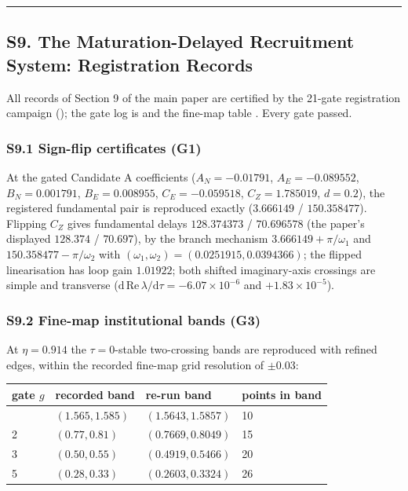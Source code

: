 \documentclass[
  10pt,
  a4paper,
]{article}
\begin{document}
\begin{center}\rule{0.5\linewidth}{0.5pt}\end{center}

\subsection{S9. The Maturation-Delayed Recruitment System: Registration
Records}\label{s9.-the-maturation-delayed-recruitment-system-registration-records}

All records of Section 9 of the main paper are certified by the 21-gate
registration campaign
(); the gate log is
 and the
fine-map table .
Every gate passed.

\subsubsection{S9.1 Sign-flip certificates
(G1)}\label{s9.1-sign-flip-certificates-g1}

At the gated Candidate A coefficients (\(A_N = -0.01791\),
\(A_E = -0.089552\), \(B_N = 0.001791\), \(B_E = 0.008955\),
\(C_E = -0.059518\), \(C_Z = 1.785019\), \(d = 0.2\)), the registered
fundamental pair is reproduced exactly (\(3.666149\) / \(150.358477\)).
Flipping \(C_Z\) gives fundamental delays \(128.374373\) / \(70.696578\)
(the paper's displayed \(128.374\) / \(70.697\)), by the branch
mechanism \(3.666149 + \pi/\omega_1\) and \(150.358477 - \pi/\omega_2\)
with \((\omega_1, \omega_2) = (0.0251915, 0.0394366)\); the flipped
linearisation has loop gain \(1.01922\); both shifted imaginary-axis
crossings are simple and transverse
(\(\mathrm{d}\,\mathrm{Re}\,\lambda/\mathrm{d}\tau = -6.07\times10^{-6}\)
and \(+1.83\times10^{-5}\)).

\subsubsection{S9.2 Fine-map institutional bands
(G3)}\label{s9.2-fine-map-institutional-bands-g3}

At \(\eta = 0.914\) the \(\tau = 0\)-stable two-crossing bands are
reproduced with refined edges, within the recorded fine-map grid
resolution of \(\pm 0.03\):

\begin{longtable}[]{@{}llll@{}}
\toprule\noalign{}
gate \(g\) & recorded band & re-run band & points in band \\
\midrule\noalign{}
\endhead
\bottomrule\noalign{}
\endlastfoot
1 & \((1.565, 1.585)\) & \((1.5643, 1.5857)\) & 10 \\
2 & \((0.77, 0.81)\) & \((0.7669, 0.8049)\) & 15 \\
3 & \((0.50, 0.55)\) & \((0.4919, 0.5466)\) & 20 \\
5 & \((0.28, 0.33)\) & \((0.2603, 0.3324)\) & 26 \\
\end{longtable}
\end{document}
